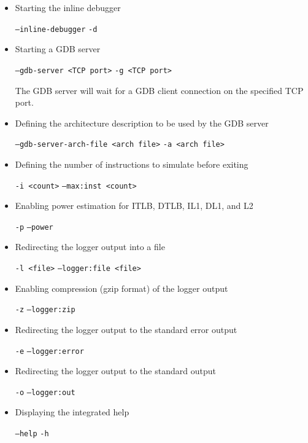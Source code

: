 \begin{itemize}

\item Starting the inline debugger

\texttt{--inline-debugger}
\texttt{-d}

\item Starting a GDB server

\texttt{--gdb-server <TCP port>}
\texttt{-g <TCP port>}

The GDB server will wait for a GDB client connection on the specified TCP port.

\item Defining the architecture description to be used by the GDB server

\texttt{--gdb-server-arch-file <arch file>}
\texttt{-a  <arch file>}

\item Defining the number of instructions to simulate before exiting

\texttt{-i <count>}
\texttt{--max:inst <count>}

\item Enabling power estimation for ITLB, DTLB, IL1, DL1, and L2

\texttt{-p}
\texttt{--power}

\item Redirecting the logger output into a file

\texttt{-l <file>}
\texttt{--logger:file <file>}

\item Enabling compression (gzip format) of the logger output

\texttt{-z}
\texttt{--logger:zip}

\item Redirecting the logger output to the standard error output

\texttt{-e}
\texttt{--logger:error}

\item Redirecting the logger output to the standard output

\texttt{-o}
\texttt{--logger:out}

\item Displaying the integrated help

\texttt{--help}
\texttt{-h}

\end{itemize}
